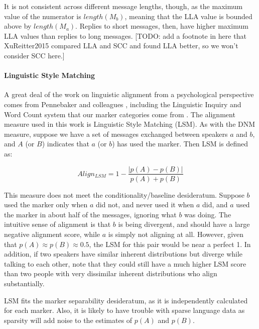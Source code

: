 \documentclass{acm_proc_article-sp}
\begin{document}
It is not consistent across different message lengths, though, as the maximum value of the numerator is $length(M_b)$, meaning that the LLA value is bounded above by $length(M_a)$. Replies to short messages, then, have higher maximum LLA values than replies to long messages. [TODO: add a footnote in here that XuReitter2015 compared LLA and SCC and found LLA better, so we won't consider SCC here.]

\paragraph{Linguistic Style Matching} A great deal of the work on linguistic alignment from a psychological perspective comes from Pennebaker and colleagues \cite{NiederhofferPennebaker2002,GonzalesHancockPennebaker2010,IrelandEtAl2011}, including the Linguistic Inquiry and Word Count system that our marker categories come from \cite{LIWC}.  The alignment measure used in this work is Linguistic Style Matching (LSM). As with the DNM measure, suppose we have a set of messages exchanged between speakers $a$ and $b$, and $A$ (or $B$) indicates that $a$ (or $b$) has used the marker. Then LSM is defined as:

\begin{equation}
Align_{LSM} = 1 - \frac{|p(A)-p(B)|}{p(A)+p(B)}
\end{equation}

This measure does not meet the conditionality/baseline desideratum. Suppose $b$ used the marker only when $a$ did not, and never used it when $a$ did, and $a$ used the marker in about half of the messages, ignoring what $b$ was doing.  The intuitive sense of alignment is that $b$ is being divergent, and should have a large negative alignment score, while $a$ is simply not aligning at all. However, given that $p(A) \approx p(B) \approx 0.5$, the LSM for this pair would be near a perfect 1.  In addition, if two speakers have similar inherent distributions but diverge while talking to each other, note that they could still have a much higher LSM score than two people with very dissimilar inherent distributions who align substantially.

LSM fits the marker separability desideratum, as it is independently calculated for each marker. Also, it is likely to have trouble with sparse language data as sparsity will add noise to the estimates of $p(A)$ and $p(B)$.

\end{document}
